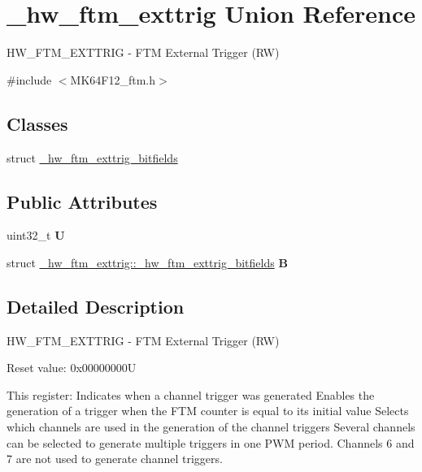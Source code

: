 \hypertarget{union__hw__ftm__exttrig}{}\section{\+\_\+hw\+\_\+ftm\+\_\+exttrig Union Reference}
\label{union__hw__ftm__exttrig}


H\+W\+\_\+\+F\+T\+M\+\_\+\+E\+X\+T\+T\+R\+IG -\/ F\+TM External Trigger (RW)  




{\ttfamily \#include $<$M\+K64\+F12\+\_\+ftm.\+h$>$}

\subsection*{Classes}
\begin{DoxyCompactItemize}
\item 
struct \hyperlink{struct__hw__ftm__exttrig_1_1__hw__ftm__exttrig__bitfields}{\+\_\+hw\+\_\+ftm\+\_\+exttrig\+\_\+bitfields}
\end{DoxyCompactItemize}
\subsection*{Public Attributes}
\begin{DoxyCompactItemize}
\item 
uint32\+\_\+t {\bfseries U}\hypertarget{union__hw__ftm__exttrig_abbc4a7497bbc688914b4df95841e17a8}{}\label{union__hw__ftm__exttrig_abbc4a7497bbc688914b4df95841e17a8}

\item 
struct \hyperlink{struct__hw__ftm__exttrig_1_1__hw__ftm__exttrig__bitfields}{\+\_\+hw\+\_\+ftm\+\_\+exttrig\+::\+\_\+hw\+\_\+ftm\+\_\+exttrig\+\_\+bitfields} {\bfseries B}\hypertarget{union__hw__ftm__exttrig_aadeeaed1bd91d26fc40b0a70baeae96d}{}\label{union__hw__ftm__exttrig_aadeeaed1bd91d26fc40b0a70baeae96d}

\end{DoxyCompactItemize}


\subsection{Detailed Description}
H\+W\+\_\+\+F\+T\+M\+\_\+\+E\+X\+T\+T\+R\+IG -\/ F\+TM External Trigger (RW) 

Reset value\+: 0x00000000U

This register\+: Indicates when a channel trigger was generated Enables the generation of a trigger when the F\+TM counter is equal to its initial value Selects which channels are used in the generation of the channel triggers Several channels can be selected to generate multiple triggers in one P\+WM period. Channels 6 and 7 are not used to generate channel triggers. 

